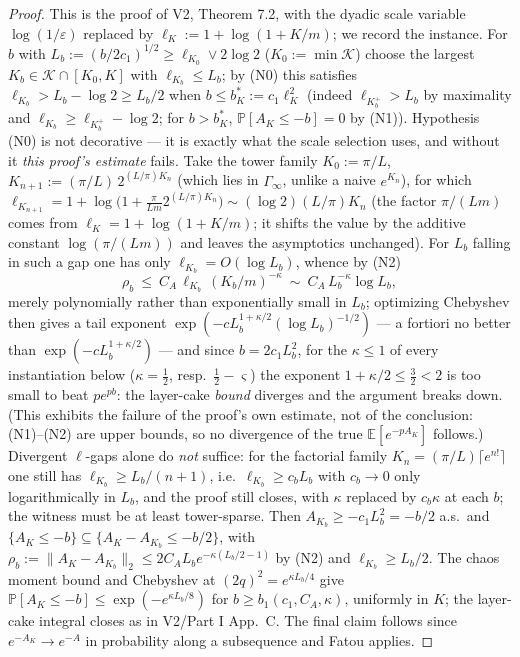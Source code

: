 \documentclass[11pt,a4paper]{article}
\theoremstyle{plain}
\theoremstyle{definition}
\newcommand{\E}{\mathbb{E}}
\newcommand{\PP}{\mathbb{P}}
\newcommand{\eps}{\varepsilon}
\begin{document}
\begin{proof}
This is the proof of V2, Theorem 7.2, with the dyadic scale variable
$\log(1/\eps)$ replaced by $\ell_K:=1+\log(1+K/m)$; we record the
instance. For $b$ with $L_b:=(b/2c_1)^{1/2}\ge\ell_{K_0}\vee2\log2$
($K_0:=\min\mathcal K$) choose the largest $K_b\in\mathcal K\cap[K_0,K]$
with $\ell_{K_b}\le L_b$; by (N0) this satisfies
$\ell_{K_b}>L_b-\log2\ge L_b/2$ when $b\le b_K^*:=c_1\ell_K^2$ (indeed
$\ell_{K_b^+}>L_b$ by maximality and $\ell_{K_b}\ge\ell_{K_b^+}-\log2$; for
$b>b_K^*$, $\PP[A_K\le-b]=0$ by (N1)). Hypothesis (N0) is not decorative --- it is exactly what the scale
selection uses, and without it \emph{this proof's estimate} fails. Take the
tower family $K_0:=\pi/L$, $K_{n+1}:=(\pi/L)\,2^{(L/\pi)K_n}$ (which lies in
$\Gamma_\infty$, unlike a naive $e^{K_n}$), for which
$\ell_{K_{n+1}}=1+\log\bigl(1+\tfrac{\pi}{Lm}2^{(L/\pi)K_n}\bigr)
\sim(\log2)(L/\pi)K_n$ (the factor $\pi/(Lm)$ comes from
$\ell_K=1+\log(1+K/m)$; it shifts the value by the additive constant
$\log(\pi/(Lm))$ and leaves the asymptotics unchanged). For $L_b$
falling in such a gap one has only $\ell_{K_b}=O(\log L_b)$, whence by (N2)
\[
 \rho_b\ \le\ C_A\,\ell_{K_b}\,(K_b/m)^{-\kappa}
 \ \sim\ C_A\,L_b^{-\kappa}\log L_b ,
\]
merely polynomially rather than exponentially small in $L_b$; optimizing
Chebyshev then gives a tail exponent
$\exp(-cL_b^{1+\kappa/2}(\log L_b)^{-1/2})$ --- a fortiori no better than
$\exp(-cL_b^{1+\kappa/2})$ --- and since
$b=2c_1L_b^2$, for the $\kappa\le1$ of every instantiation below
($\kappa=\tfrac12$, resp.\ $\tfrac12-\varsigma$) the exponent
$1+\kappa/2\le\tfrac32<2$ is too small to beat $pe^{pb}$: the layer-cake
\emph{bound} diverges and the argument breaks down. (This exhibits the
failure of the proof's own estimate, not of the conclusion: (N1)--(N2) are
upper bounds, so no divergence of the true $\E[e^{-pA_K}]$ follows.)
Divergent $\ell$-gaps alone do \emph{not} suffice: for the factorial family
$K_n=(\pi/L)\lceil e^{n!}\rceil$ one still has $\ell_{K_b}\ge L_b/(n+1)$,
i.e.\ $\ell_{K_b}\ge c_bL_b$ with $c_b\to0$ only logarithmically in $L_b$,
and the proof still closes, with $\kappa$ replaced by $c_b\kappa$ at each
$b$; the witness must be at least tower-sparse. Then
$A_{K_b}\ge-c_1L_b^2=-b/2$ a.s.\ and
$\{A_K\le-b\}\subseteq\{A_K-A_{K_b}\le-b/2\}$, with
$\rho_b:=\|A_K-A_{K_b}\|_2\le2C_AL_be^{-\kappa(L_b/2-1)}$ by (N2) and
$\ell_{K_b}\ge L_b/2$. The chaos moment bound and Chebyshev at
$(2q)^2=e^{\kappa L_b/4}$ give
$\PP[A_K\le-b]\le\exp(-e^{\kappa L_b/8})$ for $b\ge
b_1(c_1,C_A,\kappa)$, uniformly in $K$; the layer-cake integral closes
as in V2/Part I App.\ C. The final claim follows since
$e^{-A_K}\to e^{-A}$ in probability along a subsequence and Fatou applies.
\end{proof}
\end{document}
